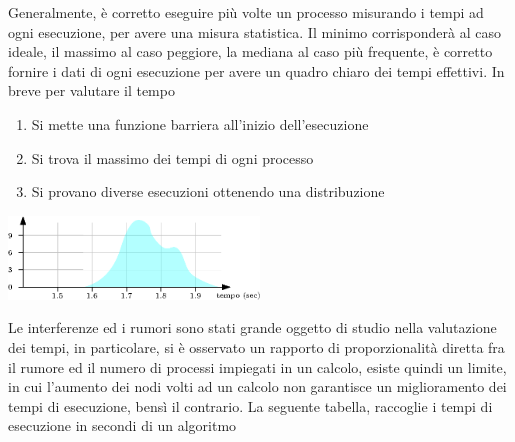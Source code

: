 \documentclass[10pt, letterpaper]{report}
\begin{document}
\acc Generalmente, è corretto eseguire più volte un processo misurando 
i tempi ad ogni esecuzione, per avere una misura statistica. Il minimo 
corrisponderà al caso ideale, il massimo al caso peggiore, la mediana al caso più 
frequente, è corretto fornire i dati di ogni esecuzione per avere 
un quadro chiaro dei tempi effettivi. In breve per valutare il tempo \begin{enumerate}
    \item Si mette una funzione barriera all'inizio dell'esecuzione 
    \item Si trova il massimo dei tempi di ogni processo 
    \item Si provano diverse esecuzioni ottenendo una distribuzione
\end{enumerate}
\begin{center}
    \includegraphics[width=0.5\textwidth]{images/distribuzioni.eps}
\end{center}
Le interferenze ed i rumori sono stati grande oggetto di studio 
nella valutazione dei tempi, in particolare, si è osservato un rapporto 
di proporzionalità diretta fra il rumore ed il numero di processi 
impiegati in un calcolo, esiste quindi un limite, in cui 
l'aumento dei nodi volti ad un calcolo non garantisce un 
miglioramento dei tempi di esecuzione, bensì il contrario.
\acc 
La seguente tabella, raccoglie i tempi di esecuzione in secondi di un algoritmo 
\end{document}
